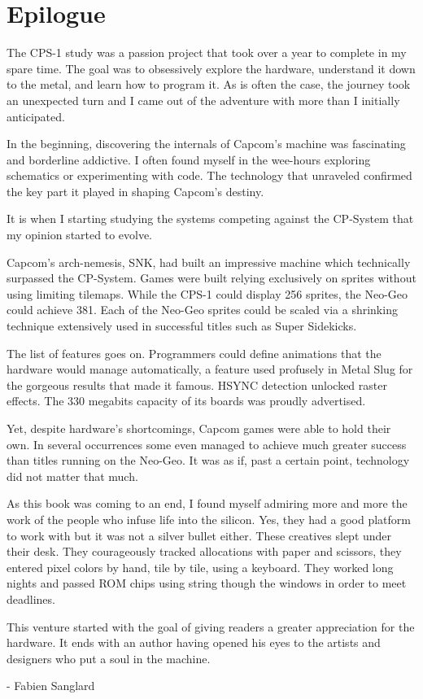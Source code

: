 \chapter{Epilogue} 

The CPS-1 study was a passion project that took over a year to complete in my spare time. The goal was to obsessively explore the hardware, understand it down to the metal, and learn how to program it. As is often the case, the journey took an unexpected turn and I came out of the adventure with more than I initially anticipated.

In the beginning, discovering the internals of Capcom's machine was fascinating and borderline addictive. I often found myself in the wee-hours exploring schematics or experimenting with code. The technology that unraveled confirmed the key part it played in shaping Capcom's destiny. 

It is when I starting studying the systems competing against the CP-System that my opinion started to evolve. 

Capcom's arch-nemesis, SNK, had built an impressive machine which technically surpassed the CP-System. Games were built relying exclusively on sprites without using limiting tilemaps. While the CPS-1 could display 256 sprites, the Neo-Geo could achieve 381. Each of the Neo-Geo sprites could be scaled via a shrinking technique extensively used in successful titles such as Super Sidekicks. 

The list of features goes on. Programmers could define animations that the hardware would manage automatically, a feature used profusely in Metal Slug for the gorgeous results that made it famous. HSYNC detection unlocked raster effects. The 330 megabits capacity of its boards was proudly advertised.

Yet, despite hardware's shortcomings, Capcom games were able to hold their own. In several occurrences some even managed to achieve much greater success than titles running on the Neo-Geo. It was as if, past a certain point, technology did not matter that much.

As this book was coming to an end, I found myself admiring more and more the work of the people who infuse life into the silicon. Yes, they had a good platform to work with but it was not a silver bullet either. These creatives slept under their desk. They courageously tracked allocations with paper and scissors, they entered pixel colors by hand, tile by tile, using a keyboard. They worked long nights and passed ROM chips using string though the windows in order to meet deadlines.

This venture started with the goal of giving readers a greater appreciation for the hardware. It ends with an author having opened his eyes to the artists and designers who put a soul in the machine.

- Fabien Sanglard
